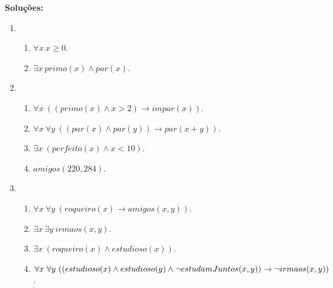     \textbf{Soluções:}

    \begin{enumerate}
        \item        
        \begin{enumerate}
            \item $\forall x \ x \ge 0$.
            \item $\exists x \ primo(x) \land par(x)$.
        \end{enumerate}
        \item
        \begin{enumerate}
            \item $\forall x \ ((primo(x) \land x > 2) \rightarrow impar(x))$.
            \item $\forall x \ \forall y \ ((par(x) \land par(y)) \rightarrow par(x + y))$.
            \item $\exists x \ (perfeito(x) \land x < 10)$.
            \item $amigos(220, 284)$.
        \end{enumerate}
        \item
        \begin{enumerate}
            \item $\forall x \ \forall y \ (roqueiro(x) \rightarrow amigos(x, y))$.
            \item $\exists x \ \exists y \ irmaos(x, y)$.
            \item $\exists x \ (roqueiro(x) \land estudioso(x))$.
            \item $\forall x \ \forall y \ ((estudioso(x) \land estudioso(y) \land \lnot estudamJuntos(x, y)) \rightarrow \\ \lnot irmaos(x, y))$.
        \end{enumerate}
    \end{enumerate}